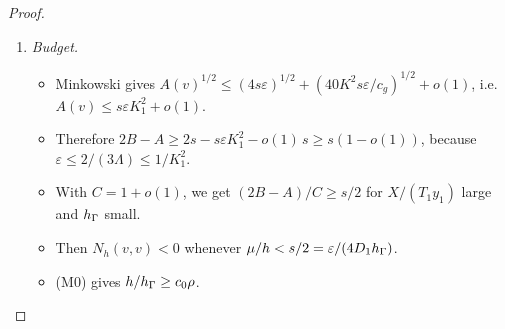 \documentclass[11pt]{article}
\theoremstyle{remark}\newtheorem{remark}[theorem]{Remark}
\begin{document}
\begin{proof}
\begin{enumerate}[label=\arabic*.]
\begin{itemize}
  \end{itemize}
\item \emph{Budget.}
  \begin{itemize}
  \item Minkowski gives $A(v)^{1/2}\le(4s\varepsilon)^{1/2}+(40K^2s\varepsilon/c_g)^{1/2}+o(1)$, i.e.
    $A(v)\le s\varepsilon K_1^2+o(1)$.
  \item Therefore $2B-A\ge2s-s\varepsilon K_1^2-o(1)\,s\ge s(1-o(1))$, because $\varepsilon\le2/(3\Lambda)\le1/K_1^2$.
  \item With $C=1+o(1)$, we get $(2B-A)/C\ge s/2$ for $X/(T_1y_1)$ large and $h_\Gamma$ small.
  \item Then $N_h(v,v)<0$ whenever $\mu/h<s/2=\varepsilon/(4D_1h_\Gamma)$.
  \item (M0) gives $h/h_\Gamma\ge c_0\rho$.\qedhere
  \end{itemize}
\end{enumerate}
\end{proof}
\end{document}

